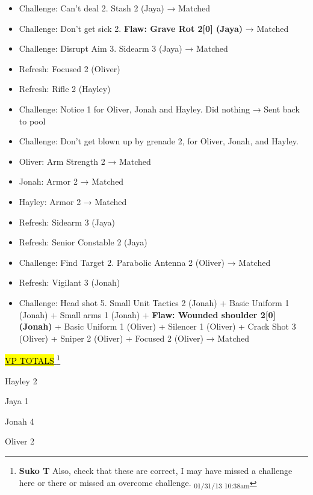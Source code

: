 \begin{itemize}
\item Challenge: Can't deal 2.  Stash 2 (Jaya) → Matched
\item Challenge: Don't get sick 2. \textbf{ {\color[RGB]{255,0,0}Flaw: Grave Rot 2{[}0{]} (Jaya)} } → Matched
\item Challenge: Disrupt Aim 3. Sidearm 3 (Jaya) → Matched
\item Refresh: Focused 2 (Oliver)
\item Refresh: Rifle 2 (Hayley)
\item Challenge: Notice 1 for Oliver, Jonah and Hayley. Did nothing → Sent back to pool
\item Challenge: Don't get blown up by grenade 2, for Oliver, Jonah, and Hayley.  
\end{itemize}

\begin{itemize}
\item Oliver: Arm Strength 2 → Matched
\item Jonah: Armor 2 → Matched
\item Hayley: Armor 2 → Matched
\end{itemize}

\begin{itemize}
\item Refresh: Sidearm 3 (Jaya)
\item Refresh: Senior Constable 2 (Jaya)
\item Challenge: Find Target 2.  Parabolic Antenna 2 (Oliver) → Matched
\item Refresh: Vigilant 3 (Jonah)
\item Challenge: Head shot 5.  Small Unit Tactics 2 (Jonah) + Basic Uniform 1 (Jonah) + Small arms 1 (Jonah) + \textbf{ {\color[RGB]{255,0,0}Flaw: Wounded shoulder 2{[}0{]} (Jonah)} } + Basic Uniform 1 (Oliver) + Silencer 1 (Oliver) + Crack Shot 3 (Oliver) + Sniper 2 (Oliver) + Focused 2 (Oliver) → Matched
\end{itemize}





\underline{  {\LARGE \hl{VP TOTALS} }  }\footnote{\textbf{Suko T }Also, check that these are correct, I may have missed a challenge here or there or missed an overcome challenge. \textsubscript{01/31/13 10:38am}}

Hayley 2

Jaya 1

Jonah 4

Oliver 2




